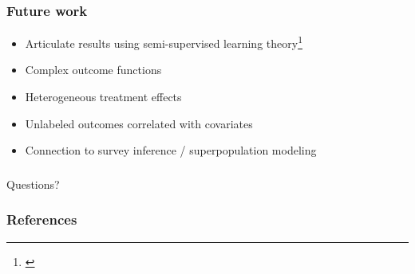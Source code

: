 \documentclass[compress]{beamer}
\begin{document}
\begin{frame} \frametitle{Future work}
 \begin{itemize}
  \item Articulate results using semi-supervised learning theory\footnote[frame]{\cite{belkin2006manifold}}
  \item Complex outcome functions
  \item Heterogeneous treatment effects
  \item Unlabeled outcomes correlated with covariates 
  \item Connection to survey inference / superpopulation modeling
 \end{itemize}
\transboxin
\end{frame}

\begin{frame} \frametitle{}
 \begin{center}
	\Huge Questions?
 \end{center}
\transboxin
\end{frame}

\begin{frame}[allowframebreaks] \frametitle{References}
 

\end{frame}
\end{document}
